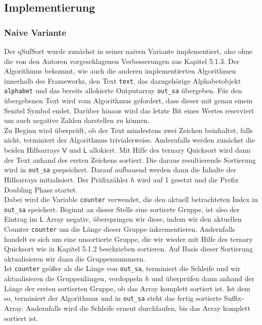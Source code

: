 \subsection{Implementierung}
\subsubsection{Naive Variante}
Der qSufSort wurde zunächst in seiner naiven Variante implementiert, also ohne die von den Autoren vorgeschlagenen Verbesserungen aus Kapitel 5.1.3. Der Algorithmus bekommt, wie auch die anderen implementierten Algorithmen innerhalb des Frameworks, den Text \texttt{text}, das dazugehörige Alphabetobjekt \texttt{alphabet} und das bereits allokierte Outputarray \texttt{out_sa} übergeben. Für den übergebenen Text wird vom Algorithmus gefordert, dass dieser mit genau einem Senitel Symbol endet. Darüber hinaus wird das letzte Bit eines Wertes reserviert um auch negative Zahlen darstellen zu können.\\
Zu Beginn wird überprüft, ob der Text mindestens zwei Zeichen beinhaltet, falls nicht, terminiert der Algorithmus trivialerweise. Andernfalls werden zunächst die beiden Hilfsarrays $\mathsf{V}$ und $\mathsf{L}$ allokiert. Mit Hilfe des ternary Quicksort wird dann der Text anhand des ersten Zeichens sortiert. Die daraus resultierende Sortierung wird in \texttt{out_sa} gespeichert. Darauf aufbauend werden dann die Inhalte der Hilfsarrays initialisiert. Der Präfixzähler $h$ wird auf 1 gesetzt und die Prefix Doubling Phase startet. \\
Dabei wird die Variable \texttt{counter} verwendet, die den aktuell betrachteten Index in \texttt{out_sa} speichert. Beginnt an dieser Stelle eine sortierte Gruppe, ist also der Eintrag im $\mathsf{L}$ Array negativ, überspringen wir diese, indem wir den aktuellen Counter \texttt{counter} um die Länge dieser Gruppe inkrementieren. Andernfalls handelt es sich um eine unsortierte Gruppe, die wir wieder mit Hilfe des ternary Quicksort wie in Kapitel 5.1.2 beschrieben sortieren. Auf Basis dieser Sortierung aktualisieren wir dann die Gruppennummern.\\ 
Ist \texttt{counter} größer als die Länge von \texttt{out_sa}, terminiert die Schleife und wir aktualisieren die Gruppenlängen, verdoppeln $h$ und überprüfen dann anhand der Länge der ersten sortierten Gruppe, ob das Array komplett sortiert ist. Ist dem so, terminiert der Algorithmus und in \texttt{out_sa} steht das fertig sortierte Suffix-Array. Andernfalls wird die Schleife erneut durchlaufen, bis das Array komplett sortiert ist.\\
